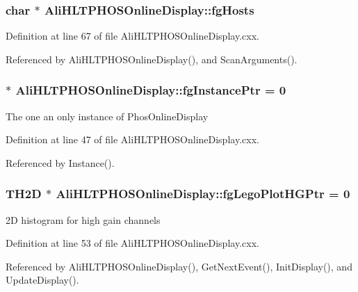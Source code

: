 \subsubsection{\setlength{\rightskip}{0pt plus 5cm}char $\ast$ {\bf Ali\-HLTPHOSOnline\-Display::fg\-Hosts}\hspace{0.3cm}{\tt  [static, private]}}\label{classAliHLTPHOSOnlineDisplay_v55}




Definition at line 67 of file Ali\-HLTPHOSOnline\-Display.cxx.

Referenced by Ali\-HLTPHOSOnline\-Display(), and Scan\-Arguments().
\subsubsection{ $\ast$ {\bf Ali\-HLTPHOSOnline\-Display::fg\-Instance\-Ptr} = 0\hspace{0.3cm}{\tt  [static, private]}}\label{classAliHLTPHOSOnlineDisplay_v37}


The one an only instance of Phos\-Online\-Display 

Definition at line 47 of file Ali\-HLTPHOSOnline\-Display.cxx.

Referenced by Instance().
\subsubsection{\setlength{\rightskip}{0pt plus 5cm}TH2D $\ast$ {\bf Ali\-HLTPHOSOnline\-Display::fg\-Lego\-Plot\-HGPtr} = 0\hspace{0.3cm}{\tt  [static, private]}}\label{classAliHLTPHOSOnlineDisplay_v39}


2D histogram for high gain channels 

Definition at line 53 of file Ali\-HLTPHOSOnline\-Display.cxx.

Referenced by Ali\-HLTPHOSOnline\-Display(), Get\-Next\-Event(), Init\-Display(), and Update\-Display().
